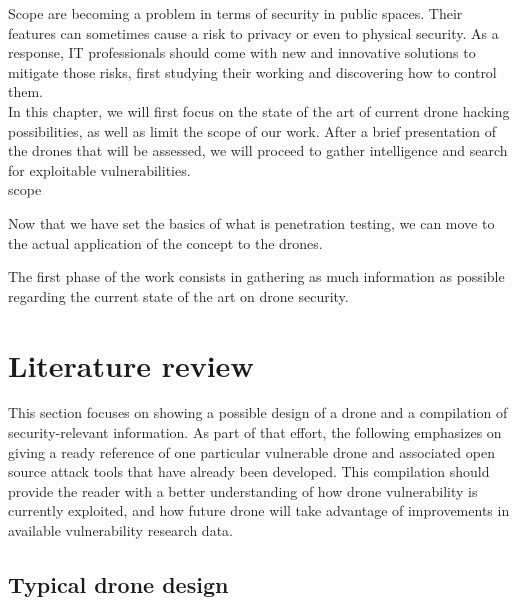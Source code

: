 \begin{chaptercover}{Scope}%
{
{\large \hyphenation{} \vspace{-.5cm}  are becoming a problem in terms of security in public spaces. Their features can sometimes cause a risk to privacy or even to physical security. As a response, IT professionals should come with new and innovative solutions to mitigate those risks, first studying their working and discovering how to control them. \newline \\ In this chapter, we will first focus on the state of the art of current drone hacking possibilities, as well as limit the scope of our work. After a brief presentation of the drones that will be assessed, we will proceed to gather intelligence and search for exploitable vulnerabilities. \newline\\}}%
{scope}

Now that we have set the basics of what is penetration testing, we can move to the actual application of the concept to the drones. 

The first phase of the work consists in gathering as much information as possible regarding the current state of the art on drone security.

\section{Literature review}

This section focuses on showing a possible design of a drone and a compilation of security-relevant information. As part of that effort, the following emphasizes on giving a ready reference of one particular vulnerable drone and associated open source attack tools that have already been developed. This compilation should provide the reader with a better understanding of how drone vulnerability is currently exploited, and how future drone will take advantage of improvements in available vulnerability research data.

\subsection{Typical drone design}\label{subsec:typical-drone-design}


\end{chaptercover}
